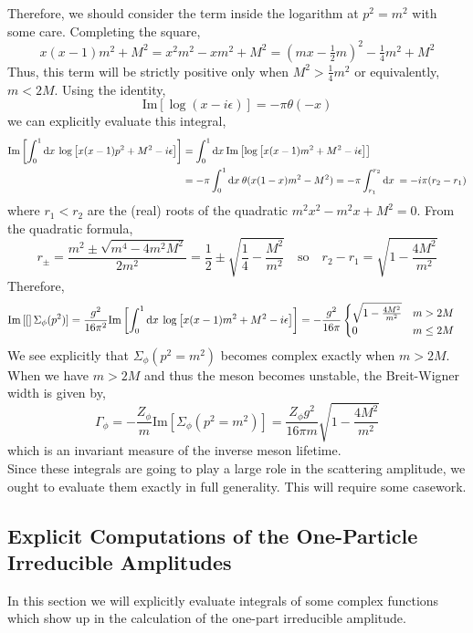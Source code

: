 \documentclass[12pt]{extarticle}
\begin{document}
Therefore, we should consider the term inside the logarithm at $p^2 = m^2$ with some care. Completing the square,
\[ x(x-1) m^2 + M^2 = x^2 m^2 - x m^2 + M^2 = (mx - \tfrac{1}{2}m)^2 - \tfrac{1}{4} m^2 + M^2 \]
Thus, this term will be strictly positive only when $M^2 > \tfrac{1}{4} m^2$ or equivalently, $m < 2 M$. Using the identity,
\[ \mathrm{Im}\left[ \log{(x - i \epsilon)} \right] = - \pi \theta(-x) \]
we can explicitly evaluate this integral,
\begin{align*}
\mathrm{Im}\left[ \int_{0}^{1} \mathrm{d}x \: \log{\left[ x(x-1)p^2 + M^2 - i \epsilon \right]} \right] & = \int_{0}^{1} \mathrm{d}x \: \mathrm{Im}\left[ \log{\left[ x(x-1)m^2 + M^2 - i \epsilon \right]} \right] 
\\
& = - \pi \int_{0}^{1} \mathrm{d}x \: \theta(x(1-x) m^2 - M^2)  = - \pi \int_{r_1}^{r_2} \mathrm{d}x \: = - i \pi (r_2 - r_1)
\end{align*} 
where $r_1 < r_2$ are the (real) roots of the quadratic $m^2 x^2 - m^2 x + M^2 = 0$. From the quadratic formula, 
\[ r_{\pm} = \frac{m^2 \pm \sqrt{m^4 - 4 m^2 M^2}}{2 m^2} = \frac{1}{2} \pm \sqrt{\frac{1}{4} - \frac{M^2}{m^2}} \quad \text{so} \quad r_2 - r_1 = \sqrt{1 - \frac{4 M^2}{m^2}} \]
Therefore,
\begin{align*}
\mathrm{Im}\left[ [ \right]\Sigma_\phi(p^2)] = \frac{g^2}{16 \pi^2}\mathrm{Im}\left[ \int_{0}^{1} \mathrm{d}x \: \log{\left[ x(x-1)m^2 + M^2 - i \epsilon \right]} \right] & = 
-\frac{g^2}{16 \pi}
\begin{cases}
\sqrt{1 - \frac{4M^2}{m^2}} & m > 2M \\
0 & m \le 2M
\end{cases}
\end{align*}
We see explicitly that $\Sigma_\phi(p^2 = m^2)$ becomes complex exactly when $m > 2 M$. When we have $m > 2 M$ and thus the meson becomes unstable, the Breit-Wigner width is given by,
\[ \Gamma_\phi = - \frac{Z_\phi}{m} \mathrm{Im}[ \Sigma_\phi(p^2 = m^2) ] =  \frac{Z_\phi g^2}{16 \pi m} \sqrt{1 - \frac{4M^2}{m^2}} \]
which is an invariant measure of the inverse meson lifetime. \bigskip\\
Since these integrals are going to play a large role in the scattering amplitude, we ought to evaluate them exactly in full generality. This will require some casework.

\subsection{Explicit Computations of the One-Particle Irreducible Amplitudes}
In this section we will explicitly evaluate integrals of some complex functions which show up in the calculation of the one-part irreducible amplitude. 
\end{document}
